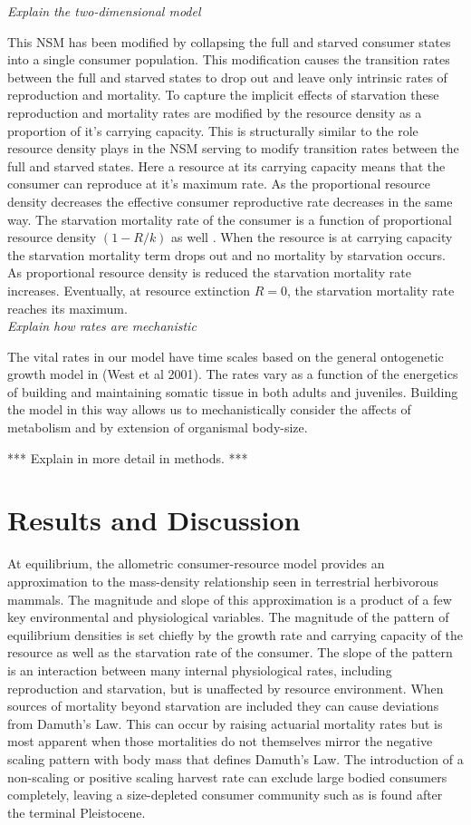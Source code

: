 \documentclass[]{rsos}%
\begin{document}
\emph{Explain the two-dimensional model}

This NSM has been modified by collapsing the full and starved consumer states into a single consumer population. This modification causes the transition rates between the full and starved states to drop out and leave only intrinsic rates of reproduction and mortality. To capture the implicit effects of starvation these reproduction and mortality rates are modified by the resource density as a proportion of it’s carrying capacity. This is structurally similar to the role resource density plays in the NSM serving to modify transition rates between the full and starved states. Here a resource at its carrying capacity means that the consumer can reproduce at it’s maximum rate. As the proportional resource density decreases the effective consumer reproductive rate decreases in the same way. The starvation mortality rate of the consumer is a function of proportional resource density $(1-R/k)$ as well . When the resource is at carrying capacity the starvation mortality term drops out and no mortality by starvation occurs. As proportional resource density is reduced the starvation mortality rate increases. Eventually, at resource extinction $R=0$, the starvation mortality rate reaches its maximum. \\


\emph{Explain how rates are mechanistic}

The vital rates in our model have time scales based on the general ontogenetic growth model in (West et al 2001). The rates vary as a function of the energetics of building and maintaining somatic tissue in both adults and juveniles. Building the model in this way allows us to mechanistically consider the affects of metabolism and by extension of organismal body-size.

*** Explain in more detail in methods. ***


\section{Results and Discussion}


At equilibrium, the allometric consumer-resource model provides an approximation to the mass-density relationship seen in terrestrial herbivorous mammals. The magnitude and slope of this approximation is a product of a few key environmental and physiological variables. The magnitude of the pattern of equilibrium densities is set chiefly by the growth rate and carrying capacity of the resource as well as the starvation rate of the consumer. The slope of the pattern is an interaction between many internal physiological rates, including reproduction and starvation, but is unaffected by resource environment. When sources of mortality beyond starvation are included they can cause deviations from Damuth's Law. This can occur by raising actuarial mortality rates but is most apparent when those mortalities do not themselves mirror the negative scaling pattern with body mass that defines Damuth's Law. The introduction of a non-scaling or positive scaling harvest rate can exclude large bodied consumers completely, leaving a size-depleted consumer community such as is found after the terminal Pleistocene. 
\end{document}
